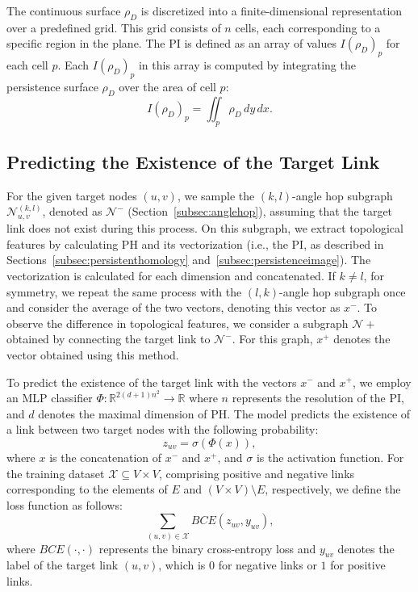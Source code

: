 The continuous surface \( \rho_D \) is discretized into a finite-dimensional representation over a predefined grid. 
This grid consists of \( n \) cells, each corresponding to a specific region in the plane. 
The PI is defined as an array of values \( I(\rho_D)_p \) for each cell $p$. 
Each $I(\rho_D)_p$ in this array is computed by integrating the persistence surface \( \rho_D \) over the area of cell $p$:
\[
 I(\rho_D)_p  = \iint_{p} \rho_D \, dy \, dx.
\]

\subsection{Predicting the Existence of the Target Link}
\label{subsec:mlp}
For the given target nodes $(u,v)$, we sample the $(k,l)$-angle hop subgraph \( \mathcal{N}^{(k,l)}_{u,v}\), denoted as \(\mathcal{N}^-\) (Section~\ref{subsec:anglehop}), assuming that the target link does not exist during this process. 
On this subgraph, we extract topological features by calculating PH and its vectorization (i.e., the PI, as described in Sections~\ref{subsec:persistenthomology} and~\ref{subsec:persistenceimage}). The vectorization is calculated for each dimension and concatenated. If $k \neq l$, for symmetry, we repeat the same process with the $(l,k)$-angle hop subgraph once and consider the average of the two vectors, denoting this vector as $x^-$. 
To observe the difference in topological features, we consider a subgraph \( \mathcal{N}+ \) obtained by connecting the target link to \(\mathcal{N}^-\).
For this graph, \(x^+\) denotes the vector obtained using this method.

To predict the existence of the target link with the vectors \(x^-\) and \(x^+\), we employ an MLP classifier $\Phi: \mathbb{R}^{2(d+1)n^2} \rightarrow \mathbb{R}$ where $n$ represents the resolution of the PI, and $d$ denotes the maximal dimension of PH. 
The model predicts the existence of a link between two target nodes with the following probability: 
\[
    z_{uv} = \sigma(\Phi(x)), 
\]
where $x$ is the concatenation of $x^-$ and $x^+$, and $\sigma$ is the activation function.
For the training dataset \(\mathcal{X} \subseteq V \times V\), comprising positive and negative links corresponding to the elements of \(E\) and \((V\times V)\setminus E\), respectively, we define the loss function as follows:
\[
    \sum_{(u,v) \in \mathcal{X}} BCE(z_{uv}, y_{uv}),
\]
where \(BCE(\cdot,\cdot)\) represents the binary cross-entropy loss and \(y_{uv}\) denotes the label of the target link \((u,v)\), which is \(0\) for negative links or \(1\) for positive links.

